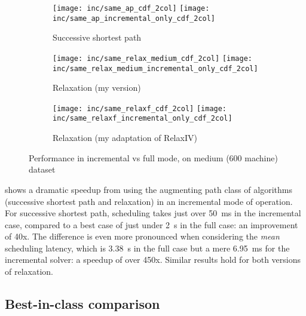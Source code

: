 \begin{figure}
    \begin{widepage}
        \begin{subfigure}[c]{\textwidth}
            \texttt{[image: inc/same\_ap\_cdf\_2col]}
            \texttt{[image: inc/same\_ap\_incremental\_only\_cdf\_2col]}
            \caption{Successive shortest path}
            \label{fig:inc-same:ssp}
        \end{subfigure}
        \begin{subfigure}[c]{\textwidth}
            \texttt{[image: inc/same\_relax\_medium\_cdf\_2col]}                        \texttt{[image: inc/same\_relax\_medium\_incremental\_only\_cdf\_2col]}
            \caption{Relaxation (my version)}
            \label{fig:inc-same:relax-my}
        \end{subfigure}
        \begin{subfigure}[c]{\textwidth}
            \texttt{[image: inc/same\_relaxf\_cdf\_2col]}
            \texttt{[image: inc/same\_relaxf\_incremental\_only\_cdf\_2col]}
            \caption{Relaxation (my adaptation of RelaxIV)}
            \label{fig:inc-same:relax-iv}
        \end{subfigure}
    \end{widepage}
    \caption{Performance in incremental vs full mode, on medium (600 machine) dataset}
    \label{fig:inc-same}
\end{figure}

 shows a dramatic speedup from using the augmenting path class of algorithms (successive shortest path and relaxation) in an incremental mode of operation. For successive shortest path, scheduling takes just over \SI{50}{\milli\second} in the incremental case, compared to a best case of just under \SI{2}{\second} in the full case: an improvement of 40x. The difference is even more pronounced when considering the \emph{mean} scheduling latency, which is \SI{3.38}{\second} in the full case but a mere \SI{6.95}{\milli\second} for the incremental solver: a speedup of over 450x. Similar results hold for both versions of relaxation.


\subsection{Best-in-class comparison}

